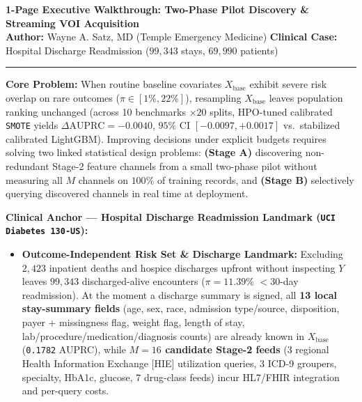 \documentclass[11pt]{article}
\begin{document}
\small
\setlength{\abovedisplayskip}{2.5pt}
\setlength{\belowdisplayskip}{2.5pt}

{\large\textbf{1-Page Executive Walkthrough: Two-Phase Pilot Discovery \& Streaming VOI Acquisition}}\\[2pt]
\textbf{Author:} Wayne A. Satz, MD (Temple Emergency Medicine) \hfill \textbf{Clinical Case:} Hospital Discharge Readmission ($99{,}343$ stays, $69{,}990$ patients)\\[-6pt]
\noindent\rule{\textwidth}{0.6pt}

\textbf{Core Problem:}
When routine baseline covariates $X_{\text{base}}$ exhibit severe risk overlap on rare outcomes ($\pi \in [1\%, 22\%]$), resampling $X_{\text{base}}$ leaves population ranking unchanged (across 10 benchmarks $\times 20$ splits, HPO-tuned calibrated \texttt{SMOTE} yields $\Delta\text{AUPRC} = -0.0040$, $95\%$ CI $[-0.0097, +0.0017]$ vs.\ stabilized calibrated LightGBM). Improving decisions under explicit budgets requires solving two linked statistical design problems: \textbf{(Stage A)} discovering non-redundant Stage-2 feature channels from a small two-phase pilot without measuring all $M$ channels on $100\%$ of training records, and \textbf{(Stage B)} selectively querying discovered channels in real time at deployment.

\textbf{Clinical Anchor — Hospital Discharge Readmission Landmark (\texttt{UCI Diabetes 130-US}):}
\begin{itemize}
  \item \textbf{Outcome-Independent Risk Set \& Discharge Landmark:} Excluding $2{,}423$ inpatient deaths and hospice discharges upfront without inspecting $Y$ leaves $99{,}343$ discharged-alive encounters ($\pi = 11.39\%$ $<30$-day readmission). At the moment a discharge summary is signed, all \textbf{13 local stay-summary fields} (age, sex, race, admission type/source, disposition, payer + missingness flag, weight flag, length of stay, lab/procedure/medication/diagnosis counts) are already known in $X_{\text{base}}$ (\texttt{0.1782} AUPRC), while \textbf{$M=16$ candidate Stage-2 feeds} (3 regional Health Information Exchange [HIE] utilization queries, 3 ICD-9 groupers, specialty, HbA1c, glucose, 7 drug-class feeds) incur HL7/FHIR integration and per-query costs.
\end{itemize}
\end{document}
